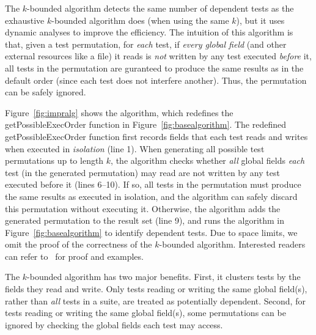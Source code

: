 
The \dependenceaware{} $k$-bounded algorithm
detects the same number of dependent tests
as the exhaustive $k$-bounded algorithm does (when using the same $k$),
but it uses dynamic analyses to improve the efficiency.
The intuition of this algorithm is that, given
a test permutation, for \textit{each} test,
if \textit{every global field} (and other external
resources like a {file}) it reads
is \textit{not} written by any test executed \textit{before} it,
all tests in the permutation are guranteed to produce
the same results as in the default order (since each
test does not interfere another). Thus, the permutation
can be safely ignored.



Figure~\ref{fig:impralg} shows the algorithm, which redefines
the getPossibleExecOrder function in Figure~\ref{fig:basealgorithm}.
The redefined getPossibleExecOrder function first records
fields that each test reads and writes when executed in \textit{isolation}
(line 1).  When generating all possible test permutations
up to length $k$, the algorithm checks whether
\textit{all} global fields \textit{each} test (in the generated permutation)
may read are not written by any test executed before it (lines 6--10).
If so, all tests in the permutation
must produce the same results as executed in isolation,
and the algorithm can safely discard this permutation without
executing it. Otherwise, the algorithm adds the generated
permutation to the result set (line 9), and runs the algorithm in Figure~\ref{fig:basealgorithm}
to identify dependent tests. %
Due to space limits, we omit the proof of the correctness
of the \dependenceaware{} $k$-bounded algorithm. Interested
readers can refer to~\cite{proof-dependence-aware} for proof
and examples.

The \dependenceaware{} $k$-bounded algorithm has two major benefits.
First, it clusters tests by the fields they
read and write. Only tests reading or writing
the same global field(s), rather than \textit{all} tests
in a suite, are treated as potentially dependent.
Second, for tests reading or writing the same global
field(s), some permutations can be ignored by checking
the global fields each test may access. 

